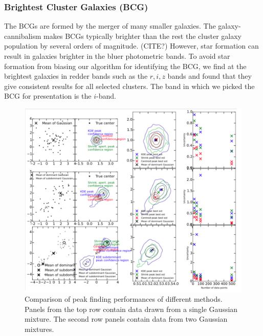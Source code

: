 \subsubsection{Brightest Cluster Galaxies (BCG)}
The BCGs are formed by the merger of many smaller
galaxies. The galaxy-cannibalism makes BCGs typically brighter than the rest the 
cluster galaxy population by several orders of magnitude. (CITE?)
However, star formation can result
in galaxies brighter in the bluer photometric bands.
To avoid star formation from biasing our algorithm for identifying the
BCG, we find at the brightest galaxies in redder bands such as the $r, i, z$
bands and found that they give consistent results for all selected clusters. 
The band in which we picked the BCG for presentation is the $i$-band. 

\begin{figure}
	\includegraphics[width=.95\linewidth]{figures/ph_fig_galaxycenter_mixtureTests.pdf}
	\caption{Comparison of peak finding performances of different methods. Panels
		from the top row contain data drawn from a single Gaussian mixture. The
	second row panels contain data from two Gaussian mixtures. }
\end{figure}



